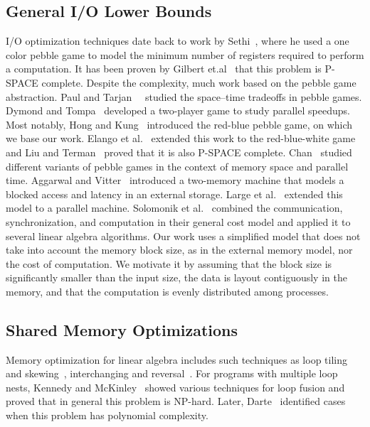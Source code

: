 \documentclass[sigplan,review,anonymous,10pt]{acmart}\settopmatter{printfolios=true,printccs=false,printacmref=false}
\begin{document}
\subsection{General I/O Lower Bounds}
I/O optimization techniques date back to work by 
Sethi~\cite{completeRegisterProblems}, where he used a one color pebble game to 
model the minimum number of registers required to perform a computation. It has 
been proven by Gilbert et.al~\cite{pebblegameregister} that this problem is 
P-SPACE complete. Despite the complexity, much work based on the pebble game 
abstraction. Paul and Tarjan~~\cite{pebbleTradeoffs} studied the space--time 
tradeoffs in pebble games. Dymond and Tompa~\cite{dymond2playerpebblegame} 
developed a 
two-player game to study parallel speedups. Most notably, Hong and 
Kung~\cite{redblue} introduced the red-blue pebble game, on which we base our 
work. Elango et al.~\cite{redbluewhite} extended this work to the 
red-blue-white 
game and Liu and Terman~\cite{redblueHard} proved that it is also P-SPACE 
complete. Chan~\cite{justApebbleGame} studied different variants of pebble 
games in the context of memory space and parallel time. Aggarwal and 
Vitter~\cite{externalMem}
introduced a two-memory machine that models a blocked access and latency in an
external storage. Large et al.~\cite{parallelExMem} extended this model to a 
parallel machine. Solomonik et al.~\cite{edgarTradeoff} combined the 
communication, synchronization, and computation in their general cost model and 
applied 
it to several linear algebra algorithms. Our work uses a simplified model 
that does not take into account the memory block size, as in the external 
memory model, nor the cost of computation. We motivate it by assuming that the 
block size is significantly smaller than the input size, the data is layout 
contiguously in the memory, and that the computation is evenly distributed 
among processes.

\subsection{Shared Memory Optimizations}
Memory optimization for linear algebra includes such techniques as loop tiling 
and skewing~\cite{tiling}, interchanging and reversal~\cite{tiling2}. For 
programs with multiple loop nests, Kennedy and McKinley~\cite{loopFusion} 
showed various techniques for loop fusion and proved that in general this 
problem is NP-hard. Later, 
Darte~\cite{loopFusionComplexity} identified cases when this problem has 
polynomial complexity.
\end{document}
